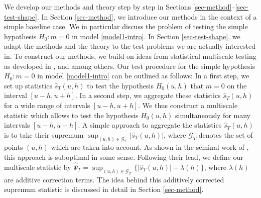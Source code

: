 We develop our methods and theory step by step in Sections \ref{sec-method}--\ref{sec-test-shape}. In Section \ref{sec-method}, we introduce our methods in the context of a simple baseline case. We in particular discuss the problem of testing the simple hypothesis $H_0: m = 0$ in model \eqref{model1-intro}. In Section \ref{sec-test-shape}, we adapt the methods and the theory to the test problems we are actually interested in. To construct our methods, we build on ideas from statistical multiscale testing as developed in \cite{ChaudhuriMarron1999,ChaudhuriMarron2000}, \cite{HallHeckman2000} and \cite{DuembgenSpokoiny2001} among others. Our test procedure for the simple hypothesis $H_0: m = 0$ in model \eqref{model1-intro} can be outlined as follows: In a first step, we set up statistics $\widehat{s}_T(u,h)$ to test the hypothesis $H_0(u,h)$ that $m = 0$ on the interval $[u-h,u+h]$. In a second step, we aggregate these statistics $\widehat{s}_T(u,h)$ for a wide range of intervals $[u-h,u+h]$. We thus construct a multiscale statistic which allows to test the hypothesis $H_0(u,h)$ simultaneously for many intervals $[u-h,u+h]$. A simple approach to aggregate the statistics $\widehat{s}_T(u,h)$ is to take their supremum $\sup_{(u,h) \in \mathcal{G_T}} |\widehat{s}_T(u,h)|$, where $\mathcal{G}_T$ denotes the set of points $(u,h)$ which are taken into account. As shown in the seminal work of \cite{DuembgenSpokoiny2001}, this approach is suboptimal in some sense. Following their lead, we define our multiscale statistic by $\widehat{\Psi}_T = \sup_{(u,h) \in \mathcal{G_T}} \{ |\widehat{s}_T(u,h)| - \lambda(h)\}$, where $\lambda(h)$ are additive correction terms. The idea behind this additively corrected supremum statistic is discussed in detail in Section \ref{sec-method}. 


